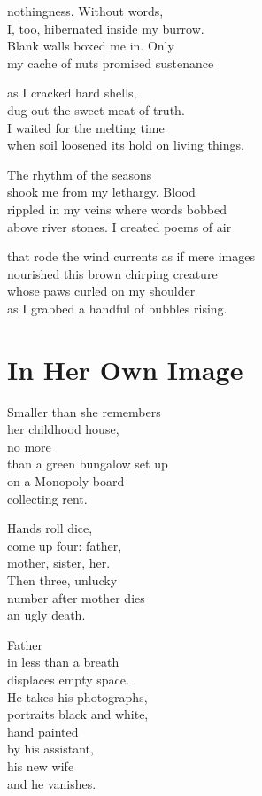 \documentclass[twoside,10pt]{book}
\begin{document}
nothingness. Without words,\\
I, too, hibernated inside my burrow.\\
Blank walls boxed me in. Only\\
my cache of nuts promised sustenance

as I cracked hard shells,\\
dug out the sweet meat of truth.\\
I waited for the melting time\\
when soil loosened its hold on living things.

The rhythm of the seasons\\
shook me from my lethargy. Blood\\
rippled in my veins where words bobbed\\
above river stones. I created poems of air

that rode the wind currents as if mere images\\
nourished this brown chirping creature\\
whose paws curled on my shoulder\\
as I grabbed a handful of bubbles rising.


\clearpage
\section{In Her Own Image}

Smaller than she remembers\\
her childhood house,\\
no more\\
than a green bungalow set up\\
on a Monopoly board\\
collecting rent.

Hands roll dice,\\
come up four: father,\\
mother, sister, her.\\
Then three, unlucky\\
number after mother dies\\
an ugly death.

Father\\
in less than a breath\\
displaces empty space.\\
He takes his photographs,\\
portraits black and white,\\
hand painted\\
by his assistant,\\
his new wife\\
and he vanishes.
\end{document}
